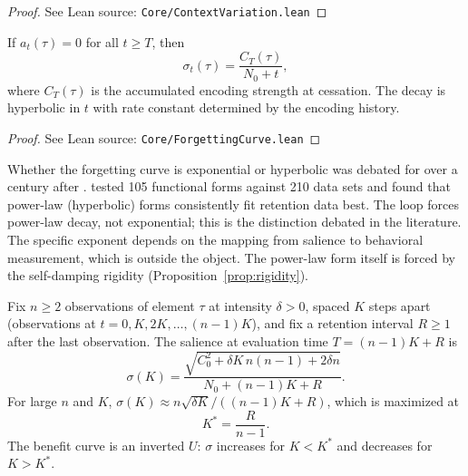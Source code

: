\begin{proof}
\leanok
{}
See Lean source: \texttt{Core/ContextVariation.lean}
\end{proof}

\begin{corollary}
\label{cor:decay}
\leanok
{}
If $a_t(\tau) = 0$ for all $t \geq T$, then
\[
\sigma_t(\tau) = \frac{C_T(\tau)}{N_0 + t},
\]
where $C_T(\tau)$ is the accumulated encoding strength at cessation.  The decay is hyperbolic in $t$ with rate constant determined by the encoding history.
\end{corollary}

\begin{proof}
\leanok
{}
See Lean source: \texttt{Core/ForgettingCurve.lean}
\end{proof}

\begin{remark}
\label{rem:forgetting}
\leanok
{}
Whether the forgetting curve is exponential or hyperbolic was debated for over a century after \citet{ebbinghaus1885}.  \citet{rubin1996} tested 105 functional forms against 210 data sets and found that power-law (hyperbolic) forms consistently fit retention data best.  The loop forces power-law decay, not exponential; this is the distinction debated in the literature.  The specific exponent depends on the mapping from salience to behavioral measurement, which is outside the object.  The power-law form itself is forced by the self-damping rigidity (Proposition~\ref{prop:rigidity}).
\end{remark}

\begin{proposition}
\label{prop:spacing}
\leanok
{}
Fix $n \geq 2$ observations of element $\tau$ at intensity $\delta > 0$, spaced $K$ steps apart (observations at $t = 0, K, 2K, \ldots, (n-1)K$), and fix a retention interval $R \geq 1$ after the last observation.  The salience at evaluation time $T = (n-1)K + R$ is
\[
\sigma(K) = \frac{\sqrt{C_0^2 + \delta K\,n(n-1) + 2\delta n}}{N_0 + (n-1)K + R}.
\]
For large $n$ and $K$, $\sigma(K) \approx n\sqrt{\delta K}/((n-1)K + R)$, which is maximized at
\[
K^* = \frac{R}{n - 1}.
\]
The benefit curve is an inverted $U$: $\sigma$ increases for $K < K^*$ and decreases for $K > K^*$.
\end{proposition}

